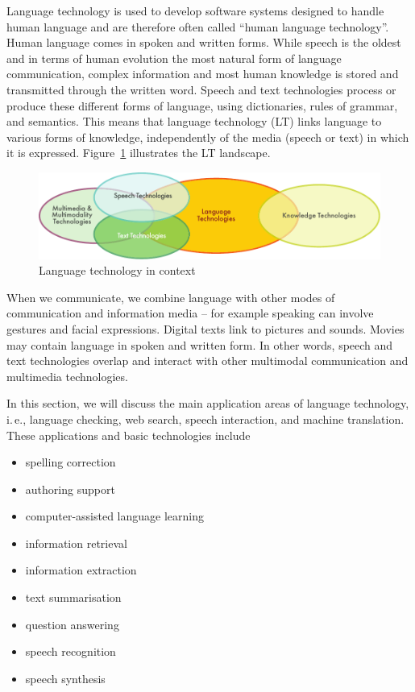 \documentclass[]{../../metanetpaper}
\begin{document}
\begin{multicols}{2}

Language technology is used to develop software systems designed to handle human language and are therefore often called ``human language technology''. Human language comes in spoken and written forms. While speech is the oldest and in terms of human evolution the most natural form of language communication, complex information and most human knowledge is stored and transmitted through the written word. Speech and text technologies process or produce these different forms of language, using dictionaries, rules of grammar, and semantics. This means that language technology (LT) links language to various forms of knowledge, independently of the media (speech or text) in which it is expressed. Figure~\ref{fig:ltincontext_en} illustrates the LT landscape.

\begin{figure}[htb]
  \center
  \includegraphics[width=\textwidth]{../_media/english/language_technologies}
  \caption{Language technology in context}
  \label{fig:ltincontext_en}
\end{figure}

When we communicate, we combine language with other modes of communication and information media -- for example speaking can involve gestures and facial expressions. Digital texts link to pictures and sounds. Movies may contain language in spoken and written form. In other words, speech and text technologies overlap and interact with other multimodal communication and multimedia technologies.

In this section, we will discuss the main application areas of language technology, i.\,e., language checking, web search, speech interaction, and machine translation. These applications and basic technologies include 

\begin{itemize}
\item spelling correction
\item authoring support
\item computer-assisted language learning
\item information retrieval 
\item information extraction
\item text summarisation
\item question answering
\item speech recognition 
\item speech synthesis 
\end{itemize}


\end{multicols}
\end{document}

